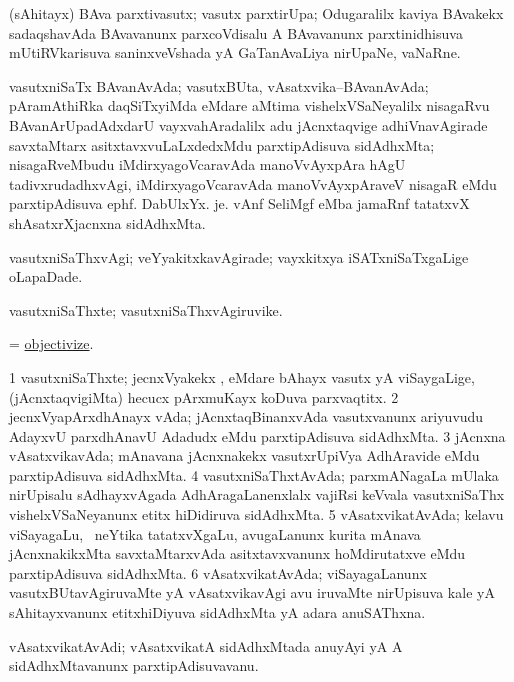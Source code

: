 \bentry
{}
\gl{\nA}
\bmng
(sAhitayx) BAva parxtivasutx; vasutx parxtirUpa; Odugaralilx kaviya BAvakekx sadaqshavAda BAvavanunx parxcoVdisalu A BAvavanunx parxtinidhisuva mUtiRVkarisuva saninxveVshada yA GaTanAvaLiya nirUpaNe, vaNaRne. 
\emng
\eentry

\bentry
{}
\gl{\nA}
\bmng
vasutxniSaTx BAvanAvAda; vasutxBUta, vAsatxvika--BAvanAvAda; pAramAthiRka daqSiTxyiMda eMdare aMtima vishelxVSaNeyalilx nisagaRvu BAvanArUpadAdxdarU vayxvahAradalilx adu jAcnxtaqvige adhiVnavAgirade savxtaMtarx asitxtavxvuLaLxdedxMdu parxtipAdisuva sidAdhxMta; nisagaRveMbudu iMdirxyagoVcaravAda manoVvAyxpAra hAgU tadivxrudadhxvAgi, iMdirxyagoVcaravAda manoVvAyxpAraveV nisagaR eMdu parxtipAdisuva ephf. DabUlxYx. je. vAnf SeliMgf eMba jamaRnf tatatxvX shAsatxrXjacnxna sidAdhxMta. 
\emng
\eentry

\bentry
{}
\gl{\kirxvi}
\bmng
vasutxniSaThxvAgi; veYyakitxkavAgirade; vayxkitxya iSATxniSaTxgaLige oLapaDade. 
\emng
\eentry

\bentry
{}
\gl{\nA}
\bmng
vasutxniSaThxte; vasutxniSaThxvAgiruvike. 
\emng
\eentry

\bentry
{}
\gl{\sakirx}
\bmng
= \hyperlink{objectivize}{objectivize}.
\emng
\eentry

\bentry
{}
\gl{\nA}
\bmng
% 
\bnum
\num{1} vasutxniSaThxte; jecnxVyakekx , eMdare bAhayx vasutx yA viSaygaLige, (jAcnxtaqvigiMta) hecucx pArxmuKayx koDuva parxvaqtitx. 
\num{2} jecnxVyapArxdhAnayx vAda; jAcnxtaqBinanxvAda vasutxvanunx ariyuvudu AdayxvU parxdhAnavU Adadudx eMdu parxtipAdisuva sidAdhxMta. 
\num{3} jAcnxna vAsatxvikavAda; mAnavana jAcnxnakekx vasutxrUpiVya AdhAravide eMdu parxtipAdisuva sidAdhxMta. 
\num{4} vasutxniSaThxtAvAda; parxmANagaLa mUlaka nirUpisalu sAdhayxvAgada AdhAragaLanenxlalx vajiRsi keVvala vasutxniSaThx vishelxVSaNeyanunx etitx hiDidiruva sidAdhxMta. 
\num{5} vAsatxvikatAvAda; kelavu viSayagaLu, \kanmu\ neYtika tatatxvXgaLu, avugaLanunx kurita mAnava jAcnxnakikxMta savxtaMtarxvAda asitxtavxvanunx hoMdirutatxve eMdu parxtipAdisuva sidAdhxMta. 
\num{6} vAsatxvikatAvAda; viSayagaLanunx vasutxBUtavAgiruvaMte yA vAsatxvikavAgi avu iruvaMte nirUpisuva kale yA sAhitayxvanunx etitxhiDiyuva sidAdhxMta yA adara anuSAThxna. 
\enum
\emng
\eentry

\bentry
{}
\gl{\nA}
\bmng
vAsatxvikatAvAdi; vAsatxvikatA sidAdhxMtada anuyAyi yA A sidAdhxMtavanunx parxtipAdisuvavanu. 
\emng
\eentry

